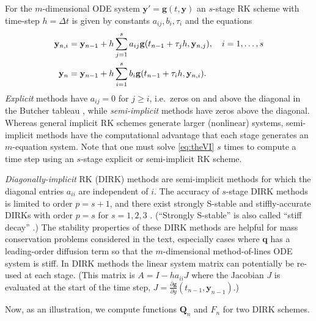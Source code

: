 \documentclass[final,onefignum]{siamart190516}
\newcommand\bg{\mathbf{g}}
\newcommand\bq{\mathbf{q}}
\newcommand\by{\mathbf{y}}
\newcommand\bQ{\mathbf{Q}}
\begin{document}
For the $m$-dimensional ODE system $\by' = \bg(t,\by)$ an $s$-stage RK scheme \cite{AscherPetzold1998} with time-step $h=\Delta t$ is given by constants $a_{ij},b_i,\tau_i$ and the equations
\begin{align}
  \by_{n,i} &= \by_{n-1} + h \sum_{j=1}^s a_{ij} \bg(t_{n-1} + \tau_j h, \by_{n,j}), \quad i=1,\dots,s \label{eq:RK2} \\
      \by_n &= \by_{n-1} + h \sum_{i=1}^s b_i \bg(t_{n-1} + \tau_i h, \by_{n,i}). \notag
\end{align}
\emph{Explicit} methods have $a_{ij}=0$ for $j\ge i$, i.e.~zeros on and above the diagonal in the Butcher tableau \cite{AscherPetzold1998}, while \emph{semi-implicit} methods have zeros above the diagonal.  Whereas general implicit RK schemes generate larger (nonlinear) systems, semi-implicit methods have the computational advantage that each stage generates an $m$-equation system.  Note that one must solve \eqref{eq:theVI} $s$ times to compute a time step using an $s$-stage explicit or semi-implicit RK scheme.

\emph{Diagonally-implicit} RK (DIRK) methods are semi-implicit methods for which the diagonal entries $a_{ii}$ are independent of $i$.  The accuracy of $s$-stage DIRK methods is limited to order $p=s+1$, and there exist strongly S-stable and stiffly-accurate \cite{AscherPetzold1998} DIRKs with order $p=s$ for $s=1,2,3$ \cite{Alexander1977}.  (``Strongly S-stable'' is also called ``stiff decay'' \cite{AscherPetzold1998}.)  The stability properties of these DIRK methods are helpful for mass conservation problems considered in the text, especially cases where $\bq$ has a leading-order diffusion term so that the $m$-dimensional method-of-lines ODE system is stiff.  In DIRK methods the linear system matrix can potentially be re-used at each stage.  (This matrix is $A = I - h a_{ii} J$ where the Jacobian $J$ is evaluated at the start of the time step, $J = \frac{\partial \bg}{\partial y}(t_{n-1},\by_{n-1})$.)

Now, as an illustration, we compute functions $\bQ_n$ and $F_n$ for two DIRK schemes.
\end{document}
